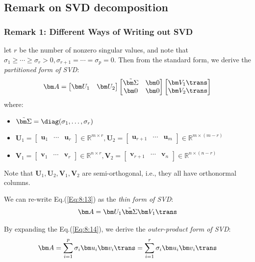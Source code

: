 \subsection{Remark on SVD decomposition}
\subsubsection{Remark 1: Different Ways of Writing out SVD}
\begin{definition}
let $r$ be the number of nonzero singular values, and note that $\sigma_1\ge\cdots\ge\sigma_r>0, \sigma_{r+1}=\cdots=\sigma_p=0$. Then from the standard form, we derive the \emph{partitioned form of SVD}:
\begin{equation}\label{Eq:8:13}
\bm A=\begin{bmatrix}
\bm U_1&\bm U_2
\end{bmatrix}\begin{bmatrix}
\tilde{\bm\Sigma}&\bm0\\\bm0&\bm0
\end{bmatrix}\begin{bmatrix}
\bm V_1\trans\\\bm V_2\trans
\end{bmatrix}
\end{equation}
where:
\begin{itemize}
\item
$\tilde{\bm\Sigma} = \diag(\sigma_1,\dots,\sigma_r)$
\item
$\bm U_1=\begin{bmatrix}
\bm u_1&\cdots&\bm u_r
\end{bmatrix}\in\mathbb{R}^{m\times r}, \bm U_2=\begin{bmatrix}
\bm u_{r+1}&\cdots&\bm u_m
\end{bmatrix}\in\mathbb{R}^{m\times (m-r)}$
\item
$\bm V_1=\begin{bmatrix}
\bm v_1&\cdots&\bm v_r
\end{bmatrix}\in\mathbb{R}^{n\times r}, \bm V_2=\begin{bmatrix}
\bm v_{r+1}&\cdots&\bm v_n
\end{bmatrix}\in\mathbb{R}^{n\times (n-r)}$
\end{itemize}
Note that $\bm U_1,\bm U_2,\bm V_1,\bm V_2$ are semi-orthogonal, i.e., they all have orthonormal columns.
\end{definition}
\begin{definition}
We can re-write Eq.(\ref{Eq:8:13}) as the \emph{thin form of SVD}:
\begin{equation}\label{Eq:8:14}
\bm A=\bm U_1\tilde{\bm\Sigma}\bm V_1\trans
\end{equation}
\end{definition}
\begin{definition}
By expanding the Eq.(\ref{Eq:8:14}), we derive the \emph{outer-product form of SVD}:
\begin{equation}\label{Eq:8:15}
\bm A=\sum_{i=1}^p\sigma_i\bm u_i\bm v_i\trans
=\sum_{i=1}^r\sigma_i\bm u_i\bm v_i\trans
\end{equation}
\end{definition}

